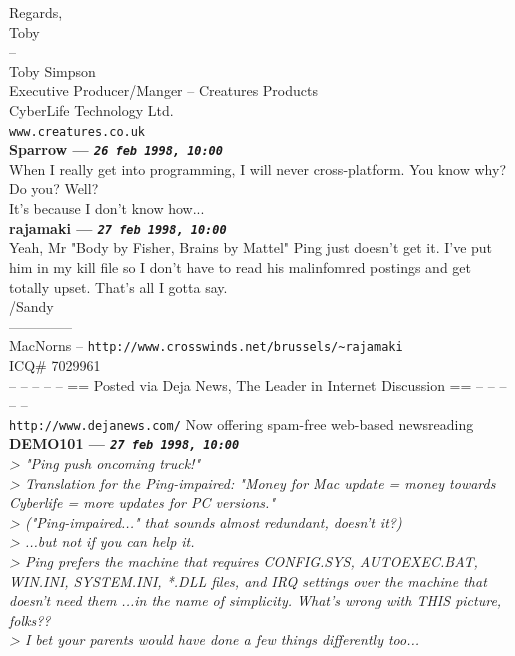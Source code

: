 \documentclass[11pt,twoside,a4paper]{article}
\begin{document}
\begin{multicols*}{2}
Regards,~\\
Toby~\\
-- ~\\
Toby Simpson~\\
Executive Producer/Manger -- Creatures Products~\\
CyberLife Technology Ltd.~\\
\texttt{www.creatures.co.uk}~\\

 
		
	
		
\textbf{Sparrow --- \emph{\texttt{26 feb 1998, 10:00}}}~\\

When I really get into programming, I will never cross-platform. You know why? Do you? Well?~\\

It's because I don't know how...~\\

 
		
	
		
\textbf{rajamaki --- \emph{\texttt{27 feb 1998, 10:00}}}~\\

Yeah, Mr "Body by Fisher, Brains by Mattel" Ping just doesn't get it. I've put him in my kill file so I don't have to read his malinfomred postings and get totally upset. That's all I gotta say.~\\

/Sandy~\\
--------------~\\
MacNorns -- \texttt{http://www.crosswinds.net/brussels/\textasciitilde rajamaki}~\\
ICQ\# 7029961~\\

-- -- -- -- -- == Posted via Deja News, The Leader in Internet Discussion == -- -- -- -- -- ~\\
\texttt{http://www.dejanews.com/}   Now offering spam-free web-based newsreading~\\

 
		
	
		
\textbf{DEMO101 --- \emph{\texttt{27 feb 1998, 10:00}}}~\\

\emph{> "Ping push oncoming truck!"}~\\
\emph{> Translation for the Ping-impaired: "Money for Mac update = money towards Cyberlife = more updates for PC versions."}~\\
\emph{> ("Ping-impaired..." that sounds almost redundant, doesn't it?)}~\\
\emph{> ...but not if you can help it. }~\\
\emph{> Ping prefers the machine that requires CONFIG.SYS, AUTOEXEC.BAT, WIN.INI, SYSTEM.INI, *.DLL files, and IRQ settings over the machine that doesn't need them ...in the name of simplicity. What's wrong with THIS picture, folks??}~\\
\emph{> I bet your parents would have done a few things differently too...}~\\


\end{multicols*}
\end{document}
